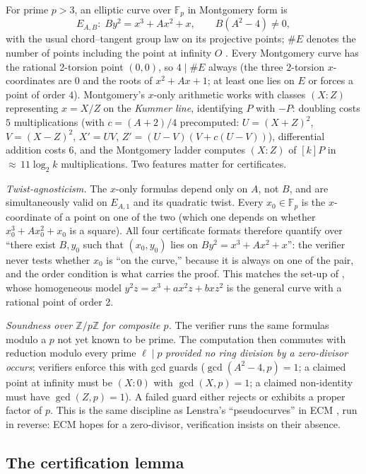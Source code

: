 \documentclass[11pt]{amsart}
\newcommand{\F}{\mathbb{F}}
\newcommand{\Z}{\mathbb{Z}}
\theoremstyle{plain}
\theoremstyle{definition}
\theoremstyle{remark}
\begin{document}
For prime $p > 3$, an elliptic curve over $\F_p$ in Montgomery form is
\[
  E_{A,B}\colon\; B y^2 = x^3 + A x^2 + x, \qquad B(A^2-4) \ne 0,
\]
with the usual chord--tangent group law on its projective points; $\#E$ denotes the number of points
including the point at infinity $O$ \cite{Sil09,Mon87}.  Every Montgomery curve has the rational
2-torsion point $(0,0)$, so $4 \mid \#E$ always (the three $2$-torsion $x$-coordinates are $0$ and the
roots of $x^2+Ax+1$; at least one lies on $E$ or forces a point of order $4$).  Montgomery's $x$-only
arithmetic works with classes $(X : Z)$ representing $x = X/Z$ on the \emph{Kummer line}, identifying
$P$ with $-P$: doubling costs $5$ multiplications (with $c = (A+2)/4$ precomputed: $U = (X+Z)^2$,
$V = (X-Z)^2$, $X' = UV$, $Z' = (U-V)(V + c(U-V))$), differential addition costs $6$, and the Montgomery
ladder computes $(X:Z)$ of $[k]P$ in ${\approx}\,11\log_2 k$ multiplications.  Two features matter for
certificates.

\emph{Twist-agnosticism.}  The $x$-only formulas depend only on $A$, not $B$, and are simultaneously
valid on $E_{A,1}$ and its quadratic twist.  Every $x_0 \in \F_p$ is the $x$-coordinate of a point on
one of the two (which one depends on whether $x_0^3+Ax_0^2+x_0$ is a square).  All four certificate
formats therefore quantify over ``there exist $B, y_0$ such that $(x_0, y_0)$ lies on
$B y^2 = x^3+Ax^2+x$'': the verifier never tests whether $x_0$ is ``on the curve,'' because it is always
on one of the pair, and the order condition is what carries the proof.  This matches the set-up of
\cite{Pom87}, whose homogeneous model $y^2z = x^3+ax^2z+bxz^2$ is the general curve with a rational
point of order 2.

\emph{Soundness over $\Z/p\Z$ for composite $p$.}  The verifier runs the same formulas modulo a $p$ not
yet known to be prime.  The computation then commutes with reduction modulo every prime $\ell \mid p$
\emph{provided no ring division by a zero-divisor occurs}; verifiers enforce this with gcd guards
($\gcd(A^2-4, p) = 1$; a claimed point at infinity must be $(X : 0)$ with $\gcd(X, p) = 1$; a claimed
non-identity must have $\gcd(Z, p) = 1$).  A failed guard either rejects or exhibits a proper factor of
$p$.  This is the same discipline as Lenstra's ``pseudocurves'' in ECM \cite{Len87}, run in reverse: ECM
hopes for a zero-divisor, verification insists on their absence.

\subsection{The certification lemma}\label{sec:lemma}
\end{document}
